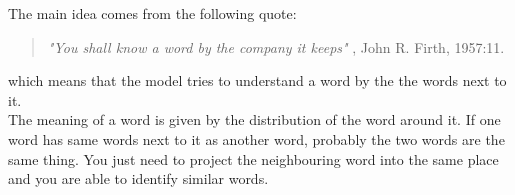 The main idea comes from the following quote:
\begin{quote}
    \textit{"You shall know a word by the company it keeps"} ,  John R. Firth, 1957:11.
\end{quote}{}
which means that the model tries to understand a word by the the words next to it. \\
The meaning of a word is given by the distribution of the word around it. If one word has same words next to it as another word, probably the two words are the same thing. You just need to project the neighbouring word into the same place and you are able to identify similar words.  



